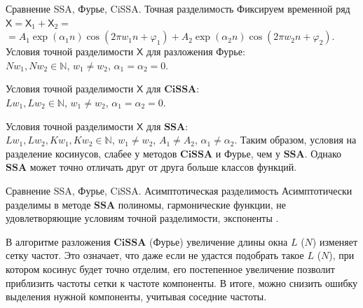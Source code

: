 \documentclass[notheorems, handout]{beamer}
\newtheorem{comment}{Замечание} %
\newcommand{\SSA}{\textbf{SSA}}
\newcommand{\CISSA}{\textbf{CiSSA}}
\newcommand{\TS}{\mathsf{X}}
\begin{document}
	
	
	\begin{frame}{Сравнение SSA, Фурье, CiSSA. Точная разделимость}
		Фиксируем временной ряд $\TS = \TS_{1} + \TS_{2} =$ $= A_1 \exp(\alpha_1 n)\cos(2\pi w_1 n + \varphi_1) + A_2 \exp(\alpha_2 n)\cos(2\pi w_2 n + \varphi_2)$.
		\newline \newline
		Условия точной разделимости $\TS$ для разложения Фурье: \\
		$Nw_1, Nw_2 \in \mathbb{N}$, $w_1 \not = w_2$, $\alpha_1  = \alpha_2 = 0$.
		
		Условия точной разделимости $\TS$ для $\CISSA$: \\
		$Lw_1, Lw_2 \in \mathbb{N}$, $w_1 \not = w_2$, $\alpha_1 = \alpha_2 = 0$.
		
		Условия точной разделимости $\TS$ для $\SSA$: \\
		$Lw_1, Lw_2, Kw_1, Kw_2 \in \mathbb{N}$, $w_1 \not = w_2$, $A_1 \not = A_2$, $\alpha_1 \not = \alpha_2$.
		\newline \newline
		Таким образом, условия на разделение косинусов, слабее у методов $\CISSA$ и Фурье, чем у $\SSA$. Однако $\SSA$ может точно отличать друг от друга больше классов функций.
	\end{frame}
	
	
	\begin{frame}{Сравнение SSA, Фурье, CiSSA. Асимптотическая разделимость}
		Асимптотически разделимы в методе $\SSA$ полиномы, гармонические функции, не удовлетворяющие условиям точной разделимости, экспоненты \cite{golyandina2001analysis}.

		В алгоритме разложения $\CISSA$ (Фурье) увеличение длины окна $L$ ($N$) изменяет сетку частот. Это означает, что даже если не удастся подобрать такое $L$ ($N$), при котором косинус будет точно отделим, его постепенное увеличение позволит приблизить частоты сетки к частоте компоненты. В итоге, можно снизить ошибку выделения нужной компоненты, учитывая соседние частоты.
	\end{frame}
	
	
	
\end{document}
